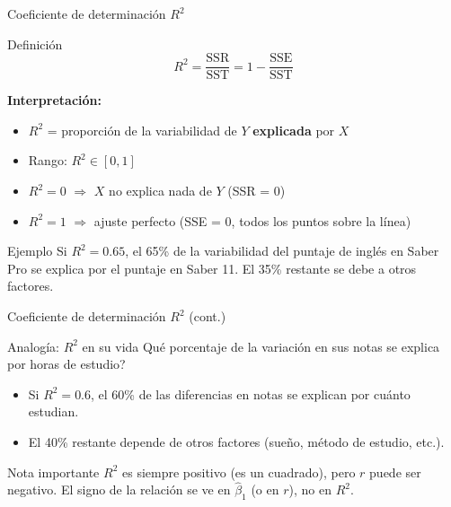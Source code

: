 \documentclass[aspectratio=169, 11pt]{beamer}
\begin{document}
\begin{frame}{Coeficiente de determinaci\'on $R^2$}
\begin{block}{Definici\'on}
\[
R^2 = \frac{\text{SSR}}{\text{SST}} = 1 - \frac{\text{SSE}}{\text{SST}}
\]
\end{block}

\vspace{0.2cm}
\textbf{Interpretaci\'on:}
\begin{itemize}
  \item $R^2$ = proporci\'on de la variabilidad de $Y$ \textbf{explicada} por $X$
  \item Rango: $R^2 \in [0, 1]$
  \item $R^2 = 0$ $\Rightarrow$ $X$ no explica nada de $Y$ (SSR = 0)
  \item $R^2 = 1$ $\Rightarrow$ ajuste perfecto (SSE = 0, todos los puntos sobre la l\'inea)
\end{itemize}

\vspace{0.2cm}
\begin{exampleblock}{Ejemplo}
Si $R^2 = 0.65$, el 65\% de la variabilidad del puntaje de ingl\'es en Saber Pro se explica por el puntaje en Saber 11. El 35\% restante se debe a otros factores.
\end{exampleblock}
\end{frame}

\begin{frame}{Coeficiente de determinaci\'on $R^2$ (cont.)}
\begin{exampleblock}{Analog\'ia: $R^2$ en su vida}
\textquestiondown Qu\'e porcentaje de la variaci\'on en sus notas se explica por horas de estudio?
\begin{itemize}
  \item Si $R^2 = 0.6$, el 60\% de las diferencias en notas se explican por cu\'anto estudian.
  \item El 40\% restante depende de otros factores (sue\~no, m\'etodo de estudio, etc.).
\end{itemize}
\end{exampleblock}

\vspace{0.3cm}
\begin{alertblock}{Nota importante}
$R^2$ es siempre positivo (es un cuadrado), pero $r$ puede ser negativo. El signo de la relaci\'on se ve en $\hat{\beta}_1$ (o en $r$), no en $R^2$.
\end{alertblock}
\end{frame}
\end{document}
